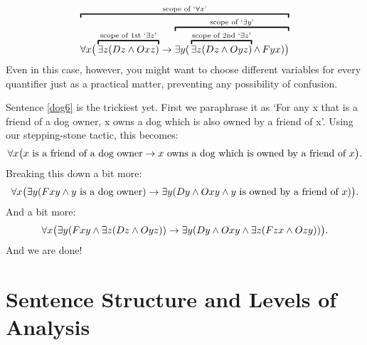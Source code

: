 $$\overbracket{\forall x\bigl(\,\overbracket{\exists z(Dz \eand Oxz)}^{\text{scope of 1st `}\exists z\text{'}}\eif \overbracket{\exists y(\,\overbracket{\exists z(Dz \eand Oyz)}^{\text{scope of 2nd `}\exists z\text{'}}\mathop{\eand} Fyx) \bigr)}^{\text{scope of `}\exists y\text{'}}}^{\text{scope of `}\forall x\text{'}}$$
Even in this case, however, you might want to choose different variables for every quantifier just as a practical matter, preventing any possibility of confusion. 

Sentence \ref{dog6} is the trickiest yet. First we paraphrase it as `For any x that is a friend of a dog owner, x owns a dog which is also owned by a friend of x'. Using our stepping-stone tactic, this becomes:
$$\forall x\bigl(x\text{ is a friend of a dog owner}\rightarrow x\text{ owns a dog which is owned by a friend of }x\bigr).$$
Breaking this down a bit more:
$$\forall x\bigl(\exists y(Fxy \wedge y\text{ is a dog owner})\rightarrow \exists y(Dy \wedge Oxy \wedge y\text{ is owned by a friend of }x) \bigr).$$
And a bit more: 
$$\forall x\bigl(\exists y(Fxy \wedge \exists z(Dz \wedge Oyz)) \rightarrow \exists y(Dy \wedge Oxy \wedge \exists z(Fzx \wedge Ozy)) \bigr).$$
And we are done!

\section{Sentence Structure and Levels of Analysis} %
\label{sec:structure_and_levels_of_analysis}


